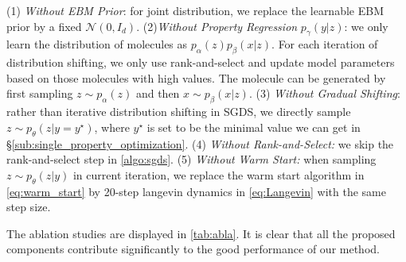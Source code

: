 \documentclass[accepted]{uai2023} %
\newcommand{\mysecref}[1]{\S\ref{#1}}
\begin{document}
(1) \textit{Without EBM Prior}: for joint distribution, we replace the learnable EBM prior by a fixed $\mathcal{N}(0,I_d)$.  (2)\textit{Without Property Regression} $p_\gamma(y|z)$: we only learn the distribution of molecules as $p_\alpha(z)p_\beta(x|z)$. For each iteration of distribution shifting, we only use rank-and-select and update model parameters based on those molecules with high values. The molecule can be generated by first sampling $z\sim p_\alpha(z)$ and then $x\sim p_\beta(x|z)$. (3) \textit{Without Gradual Shifting}: rather than iterative distribution shifting in SGDS, we directly sample $z\sim p_\theta(z|y=y^\star)$, where $y^\star$ is set to be the minimal value we can get in \mysecref{sub:single_property_optimization}. (4) \textit{Without Rank-and-Select:} we skip the rank-and-select step in \cref{algo:sgds}.
(5) \textit{Without Warm Start:} when sampling $z\sim p_\theta(z|y)$ in current iteration, we replace the warm start algorithm in \cref{eq:warm_start} by 20-step langevin dynamics in \cref{eq:Langevin} with the same step size.

\begin{table}[H]
\caption{Ablation Studies. Report the mean and standard deviation of $100$ uniquely generated molecules with the lowest $\mathrm{K_D}$(in $10^{-9}$mol/L) from last three shifted iterations (i.e. the 28th, 29th, 30th iterations of total 30 iterations).}
\label{tab:abla}
\end{table}
The ablation studies are displayed in \cref{tab:abla}.  It
is clear that all the proposed components contribute significantly to the good performance of our
method. 
\end{document}
